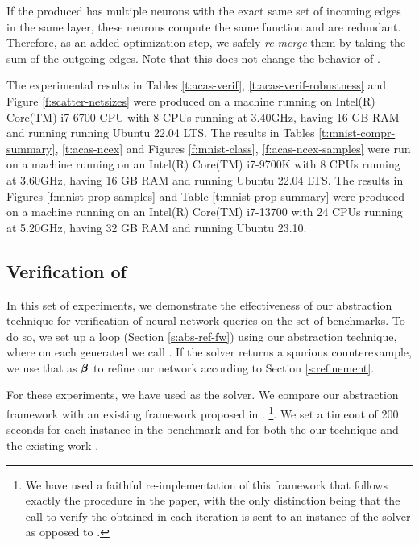 If the \abs produced has multiple neurons with the exact same set of incoming
edges in the same layer, these neurons compute the same function and are
redundant. Therefore, as an added optimization step, we safely \textit{re-merge}
them by taking the sum of the outgoing edges. Note that this does not change the
behavior of \abs.

The experimental results in Tables \ref{t:acas-verif}, \ref{t:acas-verif-robustness} and Figure
\ref{f:scatter-netsizes} were produced on a machine running on Intel(R) Core(TM) 
i7-6700 CPU with 8 CPUs running at 3.40GHz, having 16 GB RAM and running running 
Ubuntu 22.04 LTS. The results in Tables \ref{t:mnist-compr-summary}, \ref{t:acas-ncex}
and Figures \ref{f:mnist-class}, \ref{f:acas-ncex-samples} were run on a 
machine running on an Intel(R) Core(TM) i7-9700K with 8 CPUs running at
3.60GHz, having 16 GB RAM and running Ubuntu 22.04 LTS. 
The results in Figures \ref{f:mnist-prop-samples} and Table \ref{t:mnist-prop-summary} were produced on a 
machine running on an Intel(R) Core(TM) i7-13700 with 24 CPUs running at
5.20GHz, having 32 GB RAM and running Ubuntu 23.10.

\subsection{Verification of \acasxu}
\label{s:acas-verif}

In this set of experiments, we demonstrate the effectiveness of our abstraction
technique for verification of neural network queries on the \acasxu set of
benchmarks. To do so, we set up a \cegar loop (Section \ref{s:abs-ref-fw}) using
our abstraction technique, where on each \abs generated we call \neuralsat. 
If the solver returns a spurious counterexample, we use
that as $\boldsymbol{\beta}$ to refine our network according to Section
\ref{s:refinement}.  

For these experiments, we have used \neuralsat as the solver. 
We compare our abstraction framework with an existing \cegar framework proposed
in \cite{cegar-nn}. \footnote{We have used a faithful re-implementation of this framework that
follows exactly the procedure in the paper, with the only distinction being that
the call to verify the \abs obtained in each iteration is sent to an instance of
the \neuralsat solver as opposed to \marabou. }. We set a
timeout of 200 seconds for each instance in the benchmark and for both the
our technique and the existing work \cite{cegar-nn}.

